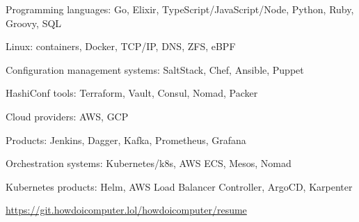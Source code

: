 \begin{cventries}
  \cventry
    {}
    {}
    {}
    {}
    {
      \begin{cvitems}
        \item {Programming languages: Go, Elixir, TypeScript/JavaScript/Node, Python, Ruby, Groovy, SQL}
        \item {Linux: containers, Docker, TCP/IP, DNS, ZFS, eBPF}
        \item {Configuration management systems: SaltStack, Chef, Ansible, Puppet}
        \item {HashiConf tools: Terraform, Vault, Consul, Nomad, Packer}
        \item {Cloud providers: AWS, GCP}
        \item {Products: Jenkins, Dagger, Kafka, Prometheus, Grafana}
        \item {Orchestration systems: Kubernetes/k8s, AWS ECS, Mesos, Nomad}
        \item {Kubernetes products: Helm, AWS Load Balancer Controller, ArgoCD, Karpenter}
      \end{cvitems}
    }
\end{cventries}

\begin{cventries}
  \cventry
    {}
    {}
    {}
    {}
    {
      \begin{cvitems}
        \item \href{https://git.howdoicomputer.lol/howdoicomputer/resume}{https://git.howdoicomputer.lol/howdoicomputer/resume}
      \end{cvitems}
    }
\end{cventries}
